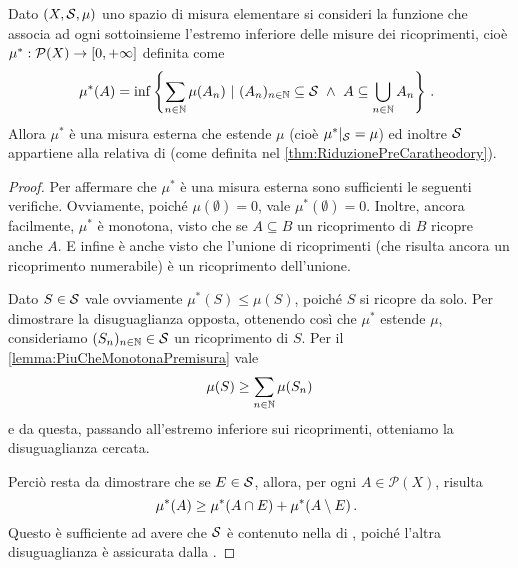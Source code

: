 \begin{proposition}\label{prop:MisuraEsternaDiPremisura}
	Dato $(X,\S,\mu)$ uno spazio di misura elementare si consideri la funzione che associa ad ogni sottoinsieme l'estremo inferiore delle misure dei ricoprimenti, cioè $\mu^*:\mathcal P(X)\to\Rpiu$ definita come 
	\begin{equation*}
		\mu^*(A)=\inf\left\{\sum_{n\in\N} \mu(A_n)\ |\ (A_n)_{n\in\N}\subseteq\S\ \wedge
		\ A\subseteq\bigcup_{n\in\N}A_n\right\} \punto
	\end{equation*}
	Allora $\mu^*$ è una misura esterna che estende $\mu$ (cioè $\mu^*|_\S=\mu$) ed inoltre $\S$ appartiene alla relativa \sigalg{} di \carat{} (come definita nel \cref{thm:RiduzionePreCaratheodory}).
\end{proposition}
\begin{proof}
	Per affermare che $\mu^*$ è una misura esterna sono sufficienti le seguenti verifiche.
	Ovviamente, poiché $\mu(\emptyset)=0$, vale $\mu^*(\emptyset)=0$. 
	Inoltre, ancora facilmente, $\mu^*$ è monotona, visto che se $A\subseteq B$ un ricoprimento di $B$ ricopre anche $A$.
	E infine è anche \sigsubadd{} visto che l'unione di ricoprimenti (che risulta ancora un ricoprimento numerabile) è un ricoprimento dell'unione.
	
	Dato $S\in\S$ vale ovviamente $\mu^*(S)\le\mu(S)$, poiché $S$ si ricopre da solo. Per dimostrare la disuguaglianza opposta, ottenendo così che $\mu^*$ estende $\mu$, consideriamo $(S_n)_{n\in\N}\in \S$ un ricoprimento di $S$. Per il \cref{lemma:PiuCheMonotonaPremisura} vale
	\begin{equation*}
		\mu(S)\ge \sum_{n\in\N} \mu(S_n)
	\end{equation*}
	e da questa, passando all'estremo inferiore sui ricoprimenti, otteniamo la disuguaglianza cercata.
	
	Perciò resta da dimostrare che se $E\in \S$, allora, per ogni $A\in\mathcal P(X)$, risulta
	\begin{equation}\label{eq:MisuraEsternaDisDifficile}
		\mu^*(A) \ge \mu^*(A\cap E)+\mu^*(A\setminus E) \punto
	\end{equation}
	Questo è sufficiente ad avere che $\S$ è contenuto nella \sigalg{} di \carat{}, poiché l'altra disuguaglianza è assicurata dalla \sigsubadd[ità].
	

\end{proof}
